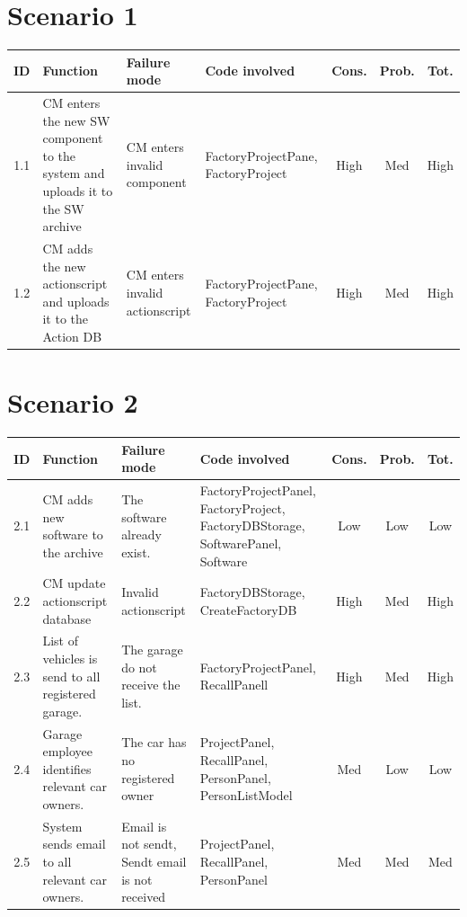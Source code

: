 	\begin{landscape}

	\section{Scenario 1}
			\begin{longtable}{ c | p{5cm} | p{5cm} | p{5cm} | c | c | c}
				\hline
				{\bf ID} & {\bf Function} & {\bf Failure mode} & {\bf Code involved} & 
				{\bf Cons.} & {\bf Prob.} & {\bf Tot.} \\ \hline
				1.1 
				& CM enters the new SW component to the system and uploads it to the SW archive
				& CM enters invalid component & FactoryProjectPane, FactoryProject
				& High & Med & High \\ \hline
				1.2 
				& CM adds the new actionscript and uploads it to the Action DB
				& CM enters invalid actionscript
				& FactoryProjectPane, FactoryProject 
				& High & Med & High \\ \hline
		\end{longtable}	

	\section{Scenario 2}

			\begin{longtable}{ c | p{5cm} | p{5cm} | p{5cm} | c | c | c}
				\hline
				{\bf ID} & {\bf Function} & {\bf Failure mode} & {\bf Code involved} & 
				{\bf Cons.} & {\bf Prob.} & {\bf Tot.} \\ \hline
				2.1 
				& CM adds new software to the archive
				& The software already exist. 
				& FactoryProjectPanel, FactoryProject, FactoryDBStorage, SoftwarePanel, Software
				& Low & Low & Low \\ \hline
				2.2 
				& CM update actionscript database
				& Invalid actionscript
				& FactoryDBStorage, CreateFactoryDB
				& High & Med & High \\ \hline
				2.3
				& List of vehicles is send to all registered garage.
				& The garage do not receive the list.
				& FactoryProjectPanel, RecallPanell
				& High & Med & High \\ \hline
				2.4
				& Garage employee identifies relevant car owners.
				& The car has no registered owner
				& ProjectPanel, RecallPanel, PersonPanel, PersonListModel
				& Med & Low & Low \\ \hline
				2.5
				& System sends email to all relevant car owners.
				& Email is not sendt, Sendt email is not received
				& ProjectPanel, RecallPanel, PersonPanel
				& Med & Med & Med \\ \hline
			

\end{longtable}
\end{landscape}
